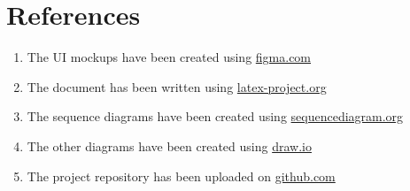 \chapter{References}

\begin{enumerate}
    \item The UI mockups have been created using \url{figma.com}
    \item The document has been written using \url{latex-project.org}
    \item The sequence diagrams have been created using \url{sequencediagram.org}
    \item The other diagrams have been created using \url{draw.io}
    \item The project repository has been uploaded on \url{github.com}
\end{enumerate}

